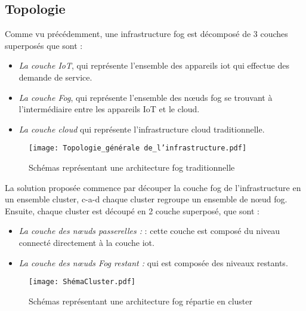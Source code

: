 \subsection{Topologie}
Comme vu précédemment, une infrastructure fog est décomposé de 3 couches superposés que sont :
\begin{itemize}
    \item \emph{La couche IoT}, qui représente l’ensemble des appareils iot qui effectue des demande de service.
    \item \emph{La couche Fog}, qui représente l’ensemble des nœuds fog se trouvant à l’intermédiaire entre les appareils IoT et le cloud.
    \item \emph{La couche cloud} qui représente l’infrastructure cloud traditionnelle.
\end{itemize}
\begin{figure}[H]
    \centering
    \texttt{[image: Topologie\_générale de\_l'infrastructure.pdf]}
    \caption{Schémas représentant une architecture fog traditionnelle}
    \label{fig:Topologie_generale de_linfrastructure}
\end{figure}
La solution proposée commence par découper la couche fog de l'infrastructure en un ensemble cluster, c-a-d chaque cluster regroupe un ensemble de nœud fog. Ensuite, chaque cluster est découpé en 2 couche superposé, que sont :
\begin{itemize}
    \item \emph{La couche des nœuds passerelles :} : cette couche est composé du niveau connecté directement à la couche iot.
    \item \emph{La couche des nœuds Fog restant :} qui est composée des niveaux restants.
\end{itemize}
\begin{figure}[H]
    \centering
    \texttt{[image: ShémaCluster.pdf]}
    \caption{Schémas représentant une architecture fog répartie en cluster}
    \label{fig:Infrastructure_fog_repartie_en_cluster}
\end{figure}
